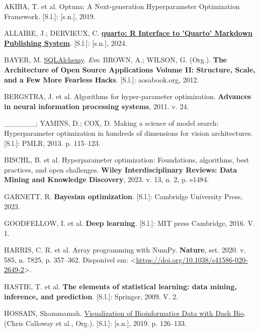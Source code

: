 \documentclass[
  12pt,
  a4paper,
]{scrreprt}
\newlength{\cslhangindent}
\newenvironment{CSLReferences}[2] %
 {\begin{list}{}{%
  \setlength{\itemindent}{0pt}
  \setlength{\leftmargin}{0pt}
  \setlength{\parsep}{0pt}
  \ifodd #1
   \setlength{\leftmargin}{\cslhangindent}
   \setlength{\itemindent}{-1\cslhangindent}
  \fi
  \setlength{\itemsep}{#2\baselineskip}}}
 {\end{list}}
\begin{document}
\label{refs}
\begin{CSLReferences}{0}{1}
AKIBA, T. et al. Optuna: A Next-generation Hyperparameter Optimization
Framework. {[}S.l.{]}: {[}s.n.{]}, 2019.

ALLAIRE, J.; DERVIEUX, C.
\textbf{\href{https://CRAN.R-project.org/package=quarto}{quarto: R
Interface to 'Quarto' Markdown Publishing System}}. {[}S.l.{]}:
{[}s.n.{]}, 2024.

BAYER, M. \href{http://aosabook.org/en/sqlalchemy.html}{SQLAlchemy}.
\emph{Em}: BROWN, A.; WILSON, G. (Org.). \textbf{The Architecture of
Open Source Applications Volume II: Structure, Scale, and a Few More
Fearless Hacks}. {[}S.l.{]}: aosabook.org, 2012.

BERGSTRA, J. et al. Algorithms for hyper-parameter optimization.
\textbf{Advances in neural information processing systems}, 2011. v. 24.

\_\_\_\_\_\_; YAMINS, D.; COX, D. Making a science of model search:
Hyperparameter optimization in hundreds of dimensions for vision
architectures. {[}S.l.{]}: PMLR, 2013. p. 115--123.

BISCHL, B. et al. Hyperparameter optimization: Foundations, algorithms,
best practices, and open challenges. \textbf{Wiley Interdisciplinary
Reviews: Data Mining and Knowledge Discovery}, 2023. v. 13, n. 2, p.
e1484.

GARNETT, R. \textbf{Bayesian optimization}. {[}S.l.{]}: Cambridge
University Press, 2023.

GOODFELLOW, I. et al. \textbf{Deep learning}. {[}S.l.{]}: MIT press
Cambridge, 2016. V. 1.

HARRIS, C. R. et al. Array programming with {NumPy}. \textbf{Nature},
set. 2020. v. 585, n. 7825, p. 357--362. Disponível em:
\textless{}\url{https://doi.org/10.1038/s41586-020-2649-2}\textgreater.

HASTIE, T. et al. \textbf{The elements of statistical learning: data
mining, inference, and prediction}. {[}S.l.{]}: Springer, 2009. V. 2.

HOSSAIN, Shammamah.
\href{https://doi.org/10.25080/Majora-7ddc1dd1-012}{{V}isualization of
{B}ioinformatics {D}ata with {D}ash {B}io}. (Chris Calloway et al.,
Org.). {[}S.l.{]}: {[}s.n.{]}, 2019. p. 126--133.


\end{CSLReferences}
\end{document}
